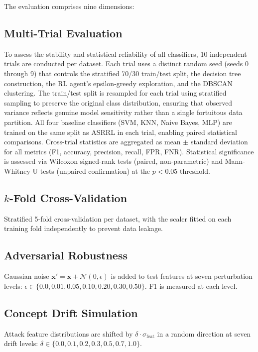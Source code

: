 \documentclass[12pt, letterpaper, oneside]{report}
\newcommand{\ASRRL}{\textsc{ASRRL}}
\newcommand{\bx}{\mathbf{x}}
\begin{document}
The evaluation comprises nine dimensions:

\subsection{Multi-Trial Evaluation}

To assess the stability and statistical reliability of all classifiers, 10 independent trials are conducted per dataset. Each trial uses a distinct random seed (seeds 0 through 9) that controls the stratified 70/30 train/test split, the decision tree construction, the RL agent's epsilon-greedy exploration, and the DBSCAN clustering. The train/test split is resampled for each trial using stratified sampling to preserve the original class distribution, ensuring that observed variance reflects genuine model sensitivity rather than a single fortuitous data partition. All four baseline classifiers (SVM, KNN, Naive Bayes, MLP) are trained on the same split as \ASRRL{} in each trial, enabling paired statistical comparisons. Cross-trial statistics are aggregated as mean $\pm$ standard deviation for all metrics (F1, accuracy, precision, recall, FPR, FNR). Statistical significance is assessed via Wilcoxon signed-rank tests (paired, non-parametric) and Mann-Whitney U tests (unpaired confirmation) at the $p < 0.05$ threshold.

\subsection{$k$-Fold Cross-Validation}

Stratified 5-fold cross-validation per dataset, with the scaler fitted on each training fold independently to prevent data leakage.

\subsection{Adversarial Robustness}

Gaussian noise $\bx' = \bx + \mathcal{N}(0, \epsilon)$ is added to test features at seven perturbation levels: $\epsilon \in \{0.0, 0.01, 0.05, 0.10, 0.20, 0.30, 0.50\}$. F1 is measured at each level.

\subsection{Concept Drift Simulation}

Attack feature distributions are shifted by $\delta \cdot \sigma_{\text{feat}}$ in a random direction at seven drift levels: $\delta \in \{0.0, 0.1, 0.2, 0.3, 0.5, 0.7, 1.0\}$.
\end{document}
